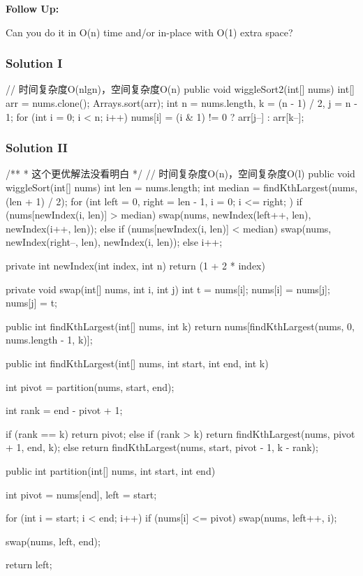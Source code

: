 \textbf{Follow Up:}

Can you do it in O(n) time and/or in-place with O(1) extra space?

\subsubsection{Solution I}

\begin{Code}
// 时间复杂度O(nlgn)，空间复杂度O(n)
public void wiggleSort2(int[] nums) {
    int[] arr = nums.clone();
    Arrays.sort(arr);
    int n = nums.length, k = (n - 1) / 2, j = n - 1;
    for (int i = 0; i < n; i++) {
        nums[i] = (i & 1) != 0 ? arr[j--] : arr[k--];
    }
}
\end{Code}

\subsubsection{Solution II}
\begin{Code}
/**
 * 这个更优解法没看明白
 */
// 时间复杂度O(n)，空间复杂度O(l)
public void wiggleSort(int[] nums) {
    int len = nums.length;
    int median = findKthLargest(nums, (len + 1) / 2);
    for (int left = 0, right = len - 1, i = 0; i <= right; ) {
        if (nums[newIndex(i, len)] > median) {
            swap(nums, newIndex(left++, len), newIndex(i++, len));
        } else if (nums[newIndex(i, len)] < median) {
            swap(nums, newIndex(right--, len), newIndex(i, len));
        } else {
            i++;
        }
    }
}

private int newIndex(int index, int n) {
    return (1 + 2 * index) %
}

private void swap(int[] nums, int i, int j) {
    int t = nums[i];
    nums[i] = nums[j];
    nums[j] = t;
}

public int findKthLargest(int[] nums, int k) {
    return nums[findKthLargest(nums, 0, nums.length - 1, k)];
}

public int findKthLargest(int[] nums, int start, int end, int k) {
    int pivot = partition(nums, start, end);

    int rank = end - pivot + 1;

    if (rank == k) {
        return pivot;
    } else if (rank > k) {
        return findKthLargest(nums, pivot + 1, end, k);
    } else {
        return findKthLargest(nums, start, pivot - 1, k - rank);
    }
}

public int partition(int[] nums, int start, int end) {
    int pivot = nums[end], left = start;

    for (int i = start; i < end; i++) {
        if (nums[i] <= pivot) {
            swap(nums, left++, i);
        }
    }

    swap(nums, left, end);

    return left;
}
\end{Code}

